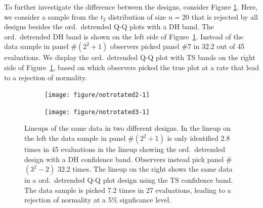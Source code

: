 \documentclass[12pt]{article}\usepackage[]{graphicx}\usepackage[]{color}
\newenvironment{knitrout}{}{} %
\begin{document}
To further investigate the difference between the designs, consider Figure \ref{fig:rotstd}. Here, we consider a sample from the $t_2$ distribution of size $n=20$ that is rejected by all designs besides the ord.\ detrended  Q-Q plots with a DH band.  
The ord.\ detrended  DH band is shown on the left side of Figure~\ref{fig:rotstd}. Instead of the data sample in panel \#$(2^2+1)$ observers picked panel \#7 in 32.2 out of 45 evaluations. We display the ord.\ detrended  Q-Q plot with TS bands on the right side of Figure~\ref{fig:rotstd}, based on which observers picked the true plot at a rate that lead to a rejection of normality.
\begin{figure}[hbt]

\begin{subfigure}{0.5\textwidth}
\begin{knitrout}
\color{fgcolor}
\texttt{[image: figure/notrotated2-1]} 

\end{knitrout}
\end{subfigure}
\begin{subfigure}{0.5\textwidth}
\begin{knitrout}
\color{fgcolor}
\texttt{[image: figure/notrotated3-1]} 

\end{knitrout}
\end{subfigure}
\caption{\label{fig:rotstd}Lineups of the same data in two different designs. %
In the lineup on the left the data sample in panel \#$(2^2+1)$ is only identified 2.8 times in 45 evaluations in the lineup showing the ord.\ detrended  design with a DH confidence band. Observers instead pick panel \#$(3^2-2)$ 32.2 times. The lineup on the right shows the same data in a ord.\ detrended  Q-Q plot design using the TS confidence band. The data sample is picked 7.2 times in 27 evaluations, leading to a rejection of normality at a 5\% signficance level.}
\end{figure}
\end{document}

